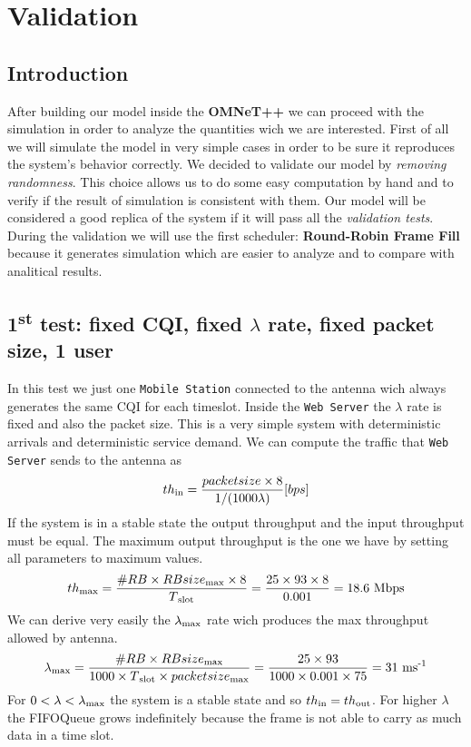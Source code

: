 \chapter{Validation}

\section{Introduction}
After building our model inside the \textbf{OMNeT++} we can proceed with the simulation in order to analyze the quantities wich we are interested. First of all we will simulate the model in very simple cases in order to be sure it reproduces the system's behavior correctly. We decided to validate our model by \textit{removing randomness}. This choice allows us to do some easy computation by hand and to verify if the result of simulation is consistent with them. Our model will be considered a good replica of the system if it will pass all the \textit{validation tests}. During the validation we will use the first scheduler: \textbf{Round-Robin Frame Fill} because it generates simulation which are easier to analyze and to compare with analitical results.

\section{1\textsuperscript{st} test: fixed CQI, fixed \(\lambda\) rate, fixed packet size, 1 user}
In this test we just one \texttt{Mobile Station} connected to the antenna wich always generates the same CQI for each timeslot. Inside the \texttt{Web Server} the \(\lambda\) rate is fixed and also the packet size. This is a very simple system with deterministic arrivals and deterministic service demand. We can compute the traffic that \texttt{Web Server} sends to the antenna as 
\begin{equation} 
	th\textsubscript{in} = \frac{packetsize \times 8}{1/(1000\lambda)} \lbrack bps \rbrack 
\end{equation} 
If the system is in a stable state the output throughput and the input throughput must be equal. The maximum output throughput is the one we have by setting all parameters to maximum values. 
\begin{equation} 
	th\textsubscript{max} = \frac{\#RB \times RBsize\textsubscript{max} \times 8}{T\textsubscript{slot}} = \frac{25 \times 93 \times 8}{0.001} = 18.6 \textnormal{ Mbps}
\end{equation} 
We can derive very easily the \(\lambda\textsubscript{max}\) rate wich produces the max throughput allowed by antenna. 
\begin{equation}
	\lambda\textsubscript{max} = \frac{\#RB \times RBsize\textsubscript{max}}{1000 \times T\textsubscript{slot} \times packetsize\textsubscript{max}} = \frac{25 \times 93}{1000 \times 0.001 \times 75} = 31 \textnormal{ ms\textsuperscript{-1}} 
\end{equation}
For \( 0<\lambda<\lambda\textsubscript{max} \) the system is a stable state and so \(th\textsubscript{in} = th\textsubscript{out}\). For higher \(\lambda\) the FIFOQueue grows indefinitely because the frame is not able to carry as much data in a time slot.

